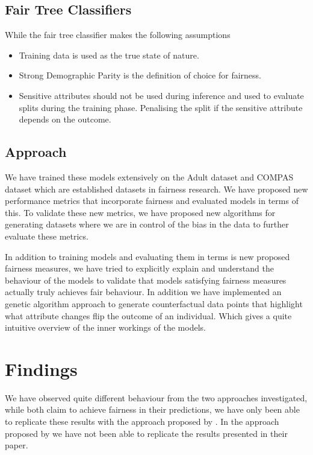 \subsection{Fair Tree Classifiers}

While the fair tree classifier makes the following assumptions

\begin{itemize}
    \item Training data is used as the true state of nature.
    \item Strong Demographic Parity is the definition of choice for fairness.
    \item Sensitive attributes should not be used during inference and used to evaluate splits during the training phase. Penalising the split if the sensitive attribute depends on the outcome.
\end{itemize}

\subsection{Approach}

We have trained these models extensively on the Adult dataset and COMPAS dataset which are established datasets in fairness research. We have proposed new performance metrics that incorporate fairness and evaluated models in terms of this. To validate these new metrics, we have proposed new algorithms for generating datasets where we are in control of the bias in the data to further evaluate these metrics.

In addition to training models and evaluating them in terms is new proposed fairness measures, we have tried to explicitly explain and understand the behaviour of the models to validate that models satisfying fairness measures actually truly achieves fair behaviour. In addition we have implemented an genetic algorithm approach to generate counterfactual data points that highlight what attribute changes flip the outcome of an individual. Which gives a quite intuitive overview of the inner workings of the models.

\section{Findings}

We have observed quite different behaviour from the two approaches investigated, while both claim to achieve fairness in their predictions, we have only been able to replicate these results with the approach proposed by \citet{Choi:2021:AIII}. In the approach proposed by \citet{Antonio:2021:arXiv} we have not been able to replicate the results presented in their paper.

